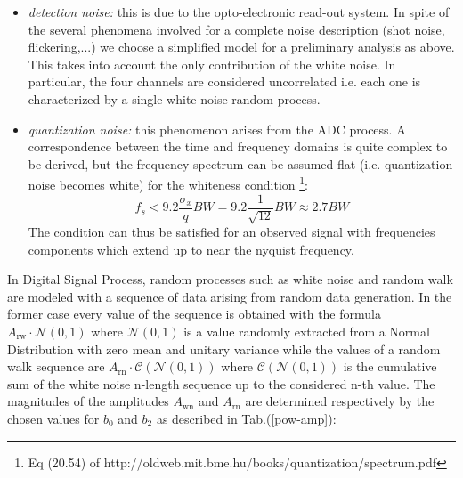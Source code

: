 \documentclass[ fontsize=11pt]{scrartcl} %
\numberwithin{equation}{section} %
\numberwithin{figure}{section} %
\numberwithin{table}{section} %
\begin{document}
\begin{itemize}
\item \textsl{detection noise:} this is due to the opto-electronic read-out system. In spite of the several phenomena involved for a complete noise description (shot noise, flickering,...) we choose a simplified model for a preliminary analysis as above. This takes  into account the only contribution of the white noise. In particular, the four channels are considered uncorrelated i.e. each one is characterized by a single white noise random process. 

\item \textsl{quantization noise:} this phenomenon arises from the ADC process. A correspondence between the time and frequency domains is quite complex to be derived, but the frequency spectrum can be assumed flat (i.e. quantization noise becomes white) for the whiteness condition \footnote{Eq (20.54) of http://oldweb.mit.bme.hu/books/quantization/spectrum.pdf}:
\begin{equation}
f_s<9.2 \frac{\sigma_x}{q}BW=9.2\frac{1}{\sqrt{12}}BW\approx 2.7BW
\end{equation}
The condition can thus be satisfied for an observed signal with frequencies components which extend up to near the nyquist frequency.

\end{itemize}

In Digital Signal Process, random processes such as white noise and random walk are modeled with a sequence of data arising from random data generation. In the former case every value of the sequence is obtained with the formula $A_{\text{rw}} \cdot \mathcal{N}(0,1) $ where $\mathcal{N}(0,1) $ is a value randomly extracted from a Normal Distribution with zero mean and unitary variance while the values of a random walk sequence are $A_{\text{rn}} \cdot \mathcal{C}(\mathcal{N}(0,1) )$ where  $\mathcal{C}(\mathcal{N}(0,1) )$ is the cumulative sum of the white noise n-length sequence up to the considered n-th value.
The magnitudes of the amplitudes $A_{\text{wn}}$ and $A_{\text{rn}}$ are determined respectively by the chosen values for $b_0$ and $b_2$ as described in Tab.(\ref{pow-amp}):
\end{document}

